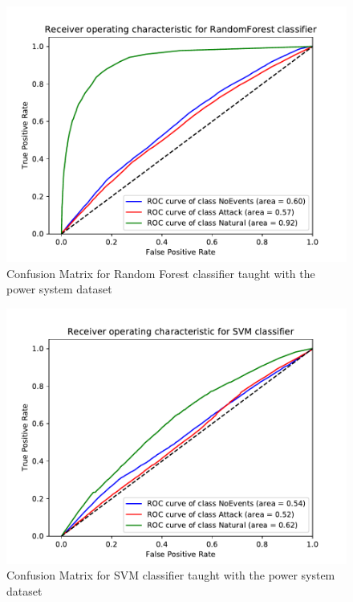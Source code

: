 \begin{figure}[t]
    \centering
    \includegraphics[page=2, width=180mm, trim= 0 50 0 100, clip]{images/results_scikit/RandomForest}
    \caption{Confusion Matrix for Random Forest classifier taught with the power system dataset}
    \label{fig:scikit_RF_CM}
\end{figure}

\begin{figure}[t]
    \centering
    \includegraphics[page=2, width=180mm, trim= 0 50 0 100, clip]{images/results_scikit/SVM}
    \caption{Confusion Matrix for SVM classifier taught with the power system dataset}
    \label{fig:scikit_SVM_CM}
\end{figure}

